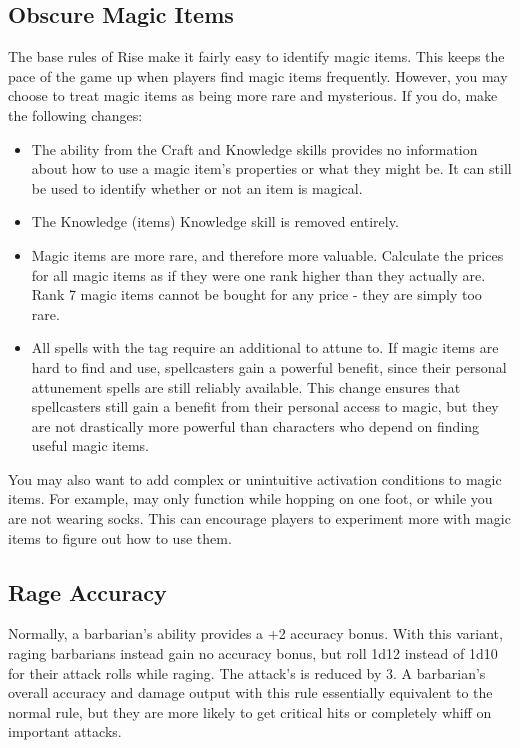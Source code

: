     \subsection{Obscure Magic Items}\label{Obscure Magic Items}
        The base rules of Rise make it fairly easy to identify magic items.
        This keeps the pace of the game up when players find magic items frequently.
        However, you may choose to treat magic items as being more rare and mysterious.
        If you do, make the following changes:
        \begin{itemize}
            \item The  ability from the Craft and Knowledge skills provides no information about how to use a magic item's properties or what they might be.
                It can still be used to identify whether or not an item is magical.
            \item The Knowledge (items) Knowledge skill is removed entirely.
            \item Magic items are more rare, and therefore more valuable.
                Calculate the prices for all magic items as if they were one rank higher than they actually are.
                Rank 7 magic items cannot be bought for any price - they are simply too rare.
            \item All spells with the  tag require an additional  to attune to.
                If magic items are hard to find and use, spellcasters gain a powerful benefit, since their personal attunement spells are still reliably available.
                This change ensures that spellcasters still gain a benefit from their personal access to magic, but they are not drastically more powerful than characters who depend on finding useful magic items.
        \end{itemize}

        You may also want to add complex or unintuitive activation conditions to magic items.
        For example,  may only function while hopping on one foot, or while you are not wearing socks.
        This can encourage players to experiment more with magic items to figure out how to use them.

    \subsection{Rage Accuracy}
        Normally, a barbarian's  ability provides a +2 accuracy bonus.
        With this variant, raging barbarians instead gain no accuracy bonus, but roll 1d12 instead of 1d10 for their attack rolls while raging.
        The attack's  is reduced by 3.
        A barbarian's overall accuracy and damage output with this rule essentially equivalent to the normal rule, but they are more likely to get critical hits or completely whiff on important attacks.

